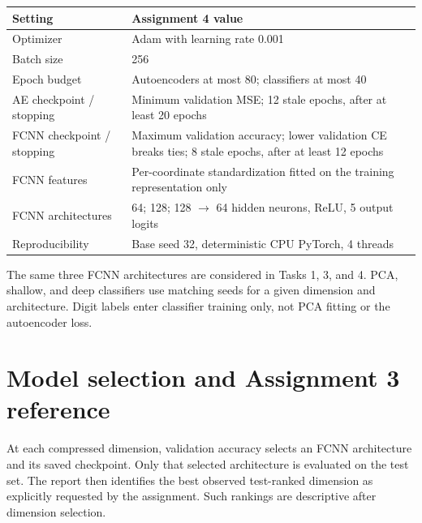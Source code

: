 \documentclass[11pt,a4paper]{article}
\begin{document}
\begin{tabularx}{\linewidth}{lY}

\toprule

\textbf{Setting} & \textbf{Assignment 4 value} \\

\midrule

Optimizer & Adam with learning rate 0.001 \\

Batch size & 256 \\

Epoch budget & Autoencoders at most 80; classifiers at most 40 \\

AE checkpoint / stopping & Minimum validation MSE; 12 stale epochs, after at least 20 epochs \\

FCNN checkpoint / stopping & Maximum validation accuracy; lower validation CE breaks ties; 8 stale epochs, after at least 12 epochs \\

FCNN features & Per-coordinate standardization fitted on the training representation only \\

FCNN architectures & 64; 128; 128 $\to$ 64 hidden neurons, ReLU, 5 output logits \\

Reproducibility & Base seed 32, deterministic CPU PyTorch, 4 threads \\

\bottomrule\end{tabularx}\endgroup\par\medskip

The same three FCNN architectures are considered in Tasks 1, 3, and 4. PCA, shallow, and deep classifiers use matching seeds for a given dimension and architecture. Digit labels enter classifier training only, not PCA fitting or the autoencoder loss.


\clearpage

\section{Model selection and Assignment 3 reference}

At each compressed dimension, validation accuracy selects an FCNN architecture and its saved checkpoint. Only that selected architecture is evaluated on the test set. The report then identifies the best observed test-ranked dimension as explicitly requested by the assignment. Such rankings are descriptive after dimension selection.
\end{document}
